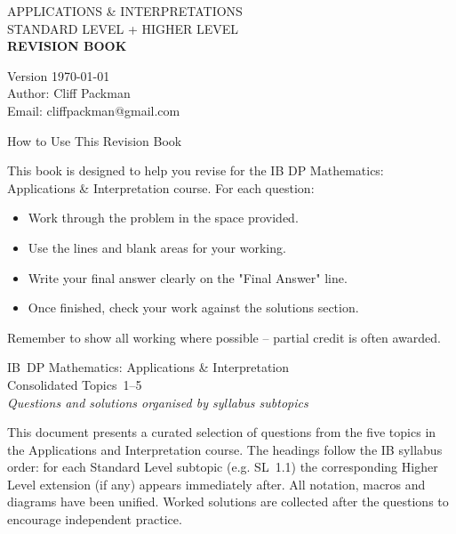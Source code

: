 \documentclass[11pt]{article}
\def\textbf#1{#1}%
\def\texttt#1{#1}%
\newcounter{question}
\newcommand{\EnableQuestionHeader}{%
  \fancyhead[L]{\large\textbf{Name: } \rule{6cm}{0.6pt}}%
  \fancyhead[R]{\large\textbf{Date: } \rule{4cm}{0.6pt}}%
}
\begin{document}
\begin{titlepage}
\begin{center}
  {\Large\color{white} APPLICATIONS \& INTERPRETATIONS}\\[0.25cm]

  {\large\color{white!92} STANDARD LEVEL \quad + \quad HIGHER LEVEL}\\[1.1cm]

  {\fontsize{28}{34}\selectfont\bfseries\color{white} REVISION BOOK}
\end{center}

\vfill
\begin{flushleft}
  {\small\color{white!85} Version \today}\\[-1pt]
  {\small\color{white!85} Author: Cliff Packman}\\[-1pt]
  {\small\color{white!85} Email: \texttt{cliffpackman@gmail.com}}
\end{flushleft}

\end{titlepage}



\begin{center}{\Large\textbf{How to Use This Revision Book}}\\\end{center}
\noindent This book is designed to help you revise for the IB DP Mathematics: Applications \& Interpretation course.
For each question:
\begin{itemize}
  \item Work through the problem in the space provided.
  \item Use the lines and blank areas for your working.
  \item Write your \textbf{final answer} clearly on the "Final Answer" line.
  \item Once finished, check your work against the solutions section.
\end{itemize}
\bigskip
\noindent Remember to show all working where possible -- partial credit is often awarded.
\newpage

\hypertarget{toc}{}%
\tableofcontents
\newpage
\EnableQuestionHeader 
\begin{center}
{\large\textbf{IB DP Mathematics: Applications \& Interpretation}}\\
\bigskip
{\Huge\textbf{Consolidated Topics 1–5}}\\
\medskip
\emph{Questions and solutions organised by syllabus subtopics}
\end{center}

\vspace{1em}
This document presents a curated selection of questions from the five topics
in the Applications and Interpretation course.  The headings follow the IB
syllabus order: for each Standard Level subtopic (e.g. SL 1.1) the
corresponding Higher Level extension (if any) appears immediately after.  All
notation, macros and diagrams have been unified.  Worked solutions are
collected after the questions to encourage independent practice.
\end{document}
